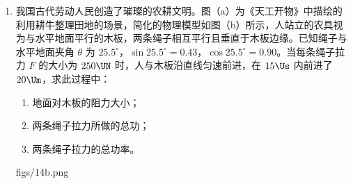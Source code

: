 \documentclass[\gkver]{gaokaozhenti}
\begin{document}
\begin{enumerate}
{（3）电压表量程为 $3 \UV$，分度值为 $0.1 \UV$，所以图（b）所示电压表示数为 $2.82 \UV$；

根据欧姆定律可知，发光元件的电阻为 $R = \frac{U}{I} = \frac{2.82}{10.0 \times 10^{-3}} \UO = 282 \UO$。

（4）根据欧姆定律 $R = \frac{U}{I}$ 可知，电流在 $1.0 \sim 18.0 \UmA$ 范围内，两个发光元件的电阻随电压增大而减小；

（5）由图（c）可知，电流为 $10.0 \UmA$ 时蓝光发光元件的电压大于红光发光元件，因此可将滑动变阻器 $R_{2}$ 与红光发光元件串联后再与蓝光发光元件并联后接入电路，如图所示

}

\item
我国古代劳动人民创造了璀璨的农耕文明。图（a）为《天工开物》中描绘的利用耕牛整理田地的场景，简化的物理模型如图（b）所示，人站立的农具视为与水平地面平行的木板，两条绳子相互平行且垂直于木板边缘。已知绳子与水平地面夹角 $\theta$ 为 $25.5^\circ$，$\sin25.5^\circ = 0.43$，$\cos25.5^\circ = 0.90$。当每条绳子拉力 $F$ 的大小为 $250 \UN$ 时，人与木板沿直线匀速前进，在 $15 \Us$ 内前进了 $20 \Um$，求此过程中：
\begin{enumerate}
	\item
	地面对木板的阻力大小；
	\item
	两条绳子拉力所做的总功；
	\item
	两条绳子拉力的总功率。
\end{enumerate}

{figs/14b.png}
\end{enumerate}
\end{document}
